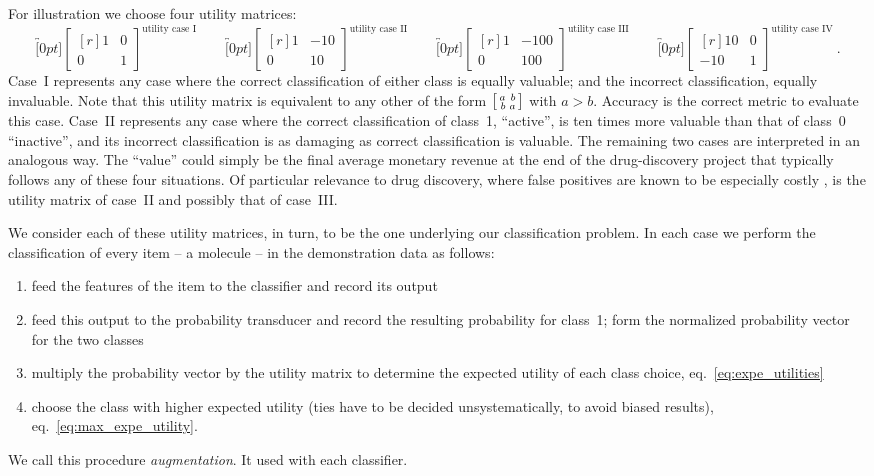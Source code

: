 \documentclass[\ifafour a4paper,12pt,\else a5paper,10pt,\fi%
onecolumn,oneside,article,%
british%
]{memoir}
\theoremstyle{remark}
\theoremstyle{innote}
\renewcommand*{\|}[1][]{\nonscript\:#1\vert\nonscript\:\mathopen{}}
\newcommand*{\sect}{\S}%
\newcommand*{\eqn}{eq.}%
\newcommand*{\umatrix}[4]{\begin{bmatrix*}[r]#1&#2\\#3&#4\end{bmatrix*}}
\newcommand*{\sumatrix}[4]{\begin{bsmallmatrix*}[r]#1&#2\\#3&#4\end{bsmallmatrix*}}
\begin{document}
For illustration we choose four utility matrices:
\begin{equation}
  \label{eq:utility_matrices_demo}
  \overbracket[0pt]{\umatrix{1}{0}{0}{1}}^{\text{utility case I}} \qquad
  \overbracket[0pt]{\umatrix{1}{-10}{0}{10}}^{\text{utility case II}} \qquad
  \overbracket[0pt]{\umatrix{1}{-100}{0}{100}}^{\text{utility case III}} \qquad
  \overbracket[0pt]{\umatrix{10}{0}{-10}{1}}^{\text{utility case IV}} \ .
\end{equation}
Case~I represents any case where the correct classification of either class is equally valuable; and the incorrect classification, equally invaluable. Note that this utility matrix is equivalent to any other of the form $\sumatrix{a}{b}{b}{a}$ with $a>b$. Accuracy is the correct metric to evaluate this case. Case~II represents any case where the correct classification of class~1, \enquote{active}, is ten times more valuable than that of class~0 \enquote{inactive}, and its incorrect classification is as damaging as correct classification is valuable. The remaining two cases are interpreted in an analogous way. The \enquote{value} could simply be the final average monetary revenue at the end of the drug-discovery project that typically follows any of these four situations. Of particular relevance to drug discovery, where false positives are known to be especially costly \autocites{sinketal2010,hingoranietal2019}, is the utility matrix of case~II and possibly that of case~III.

We consider each of these utility matrices, in turn, to be the one underlying our classification problem. In each case we perform the classification of every item -- a molecule -- in the demonstration data as follows:
\begin{enumerate}[label=\arabic*.]
\item feed the features of the item to the classifier and record its output
\item feed this output to the probability transducer and record the resulting probability for class~1; form the normalized probability vector for the two classes 
\item multiply the probability vector by the utility matrix to determine the expected utility of each class choice, \eqn~\eqref{eq:expe_utilities}
\item choose the class with higher expected utility (ties have to be decided unsystematically, to avoid biased results), \eqn~\eqref{eq:max_expe_utility}.
\end{enumerate}
We call this procedure \emph{augmentation}. It used with each classifier.
\end{document}

